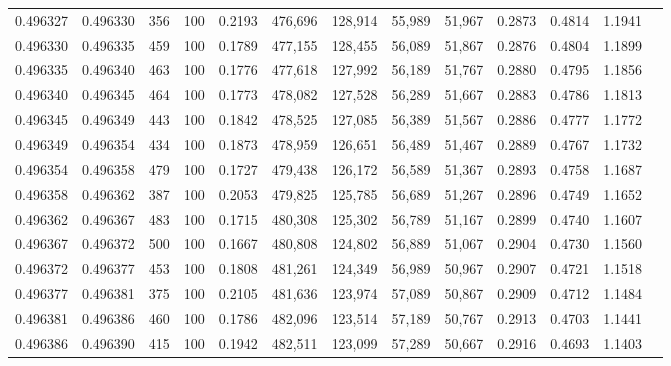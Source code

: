 \begin{tabular}{rrrrrrrrrrrrr}
0.496327 & 0.496330 &   356 & 100 &                                     0.2193 & 476,696 & 128,914 &  55,989 &  51,967 & 0.2873 & 0.4814 & 1.1941 \\
0.496330 & 0.496335 &   459 & 100 &                                     0.1789 & 477,155 & 128,455 &  56,089 &  51,867 & 0.2876 & 0.4804 & 1.1899 \\
0.496335 & 0.496340 &   463 & 100 &                                     0.1776 & 477,618 & 127,992 &  56,189 &  51,767 & 0.2880 & 0.4795 & 1.1856 \\
0.496340 & 0.496345 &   464 & 100 &                                     0.1773 & 478,082 & 127,528 &  56,289 &  51,667 & 0.2883 & 0.4786 & 1.1813 \\
0.496345 & 0.496349 &   443 & 100 &                                     0.1842 & 478,525 & 127,085 &  56,389 &  51,567 & 0.2886 & 0.4777 & 1.1772 \\
0.496349 & 0.496354 &   434 & 100 &                                     0.1873 & 478,959 & 126,651 &  56,489 &  51,467 & 0.2889 & 0.4767 & 1.1732 \\
0.496354 & 0.496358 &   479 & 100 &                                     0.1727 & 479,438 & 126,172 &  56,589 &  51,367 & 0.2893 & 0.4758 & 1.1687 \\
0.496358 & 0.496362 &   387 & 100 &                                     0.2053 & 479,825 & 125,785 &  56,689 &  51,267 & 0.2896 & 0.4749 & 1.1652 \\
0.496362 & 0.496367 &   483 & 100 &                                     0.1715 & 480,308 & 125,302 &  56,789 &  51,167 & 0.2899 & 0.4740 & 1.1607 \\
0.496367 & 0.496372 &   500 & 100 &                                     0.1667 & 480,808 & 124,802 &  56,889 &  51,067 & 0.2904 & 0.4730 & 1.1560 \\
0.496372 & 0.496377 &   453 & 100 &                                     0.1808 & 481,261 & 124,349 &  56,989 &  50,967 & 0.2907 & 0.4721 & 1.1518 \\
0.496377 & 0.496381 &   375 & 100 &                                     0.2105 & 481,636 & 123,974 &  57,089 &  50,867 & 0.2909 & 0.4712 & 1.1484 \\
0.496381 & 0.496386 &   460 & 100 &                                     0.1786 & 482,096 & 123,514 &  57,189 &  50,767 & 0.2913 & 0.4703 & 1.1441 \\
0.496386 & 0.496390 &   415 & 100 &                                     0.1942 & 482,511 & 123,099 &  57,289 &  50,667 & 0.2916 & 0.4693 & 1.1403 \\

\end{tabular}
